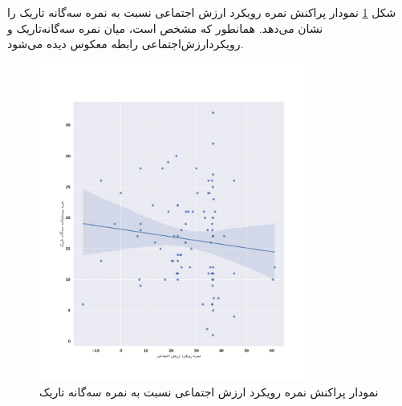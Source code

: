 شکل 
\ref{fig:ScatterSVOScoreDarkTriadScoreSNS}
نمودار پراکنش نمره رویکرد ارزش اجتماعی نسبت به نمره سه‌گانه تاریک را نشان می‌دهد. همانطور که مشخص است، میان نمره 
سه‌گانه‌تاریک و رویکرد‌ارزش‌اجتماعی رابطه معکوس دیده می‌شود.
\begin{figure}[htpb]
    \centering
    \includegraphics[width=0.8\textwidth]{./img/ScatterSVOScoreDarkTriadScoreSNS.png}
    \caption{نمودار پراکنش نمره رویکرد ارزش اجتماعی  نسبت به نمره سه‌گانه تاریک}
    \label{fig:ScatterSVOScoreDarkTriadScoreSNS}
\end{figure}

